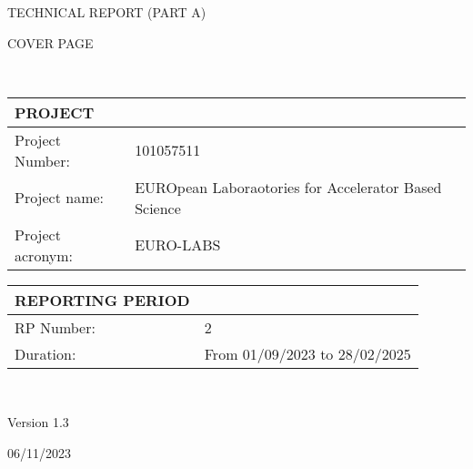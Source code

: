 %
%


\vspace*{-0.05cm}

{\fontsize{12}{15}\bf\color{mycayenne}
        \centerline{TECHNICAL REPORT (PART A)}
        
        COVER PAGE}\\%
  \setlength{\parindent}{0pt}

  \begin{center}
  \def\arraystretch{1.25}
  {\fontsize{9}{11}\selectfont
  \begin{tabular}[t]{!{\color{mygray}\vrule}p{.25\linewidth}!{\color{mygray}\vrule}p{.60\linewidth}!{\color{mygray}\vrule}} \hline
    {\rule{0pt}{2.5ex}\color{myblack}\bf PROJECT} \\ \hline
    Project Number: & 101057511 \\ \hline
    Project name: & EUROpean Laboraotories for Accelerator Based Science \\ \hline
    Project acronym: & EURO-LABS \\
    \hline
  \end{tabular}

  \vspace*{1cm}
  
  \begin{tabular}[t]{!{\color{mygray}\vrule}p{.25\linewidth}!{\color{mygray}\vrule}p{.60\linewidth}!{\color{mygray}\vrule}} \hline
    {\rule{0pt}{2.5ex}\color{myblack}\bf REPORTING PERIOD} \\ \hline
    RP Number: & 2 \\ \hline
    Duration: & From 01/09/2023 to 28/02/2025 \\ \hline
  \end{tabular}
}\\[3ex]

    \vspace*{2cm}
    
    Version 1.3

    \vspace*{0.5cm}
    06/11/2023
\end{center}
\clearpage
\restoregeometry